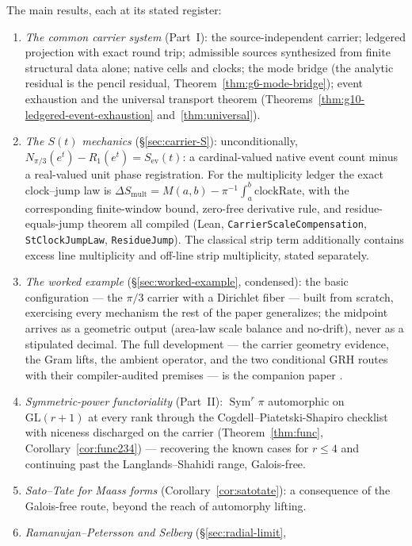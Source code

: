 \documentclass[11pt]{article}
\theoremstyle{definition}
\newcommand{\Sym}{\operatorname{Sym}}
\begin{document}
The main results, each at its stated register:
\begin{enumerate}
\item \emph{The common carrier system} (Part~I): the source-independent
carrier; ledgered projection with exact round trip; admissible sources
synthesized from finite structural data alone; native cells and clocks; the
mode bridge (the analytic residual is the pencil residual,
Theorem~\ref{thm:g6-mode-bridge}); event exhaustion and the universal
transport theorem (Theorems~\ref{thm:g10-ledgered-event-exhaustion}
and~\ref{thm:universal}).
\item \emph{The $S(t)$ mechanics} (\S\ref{sec:carrier-S}): unconditionally,
$N_{\pi/3}(e^{t})-R_{1}(e^{t})=S_{\mathrm{ev}}(t)$: a cardinal-valued native
event count minus a real-valued unit phase registration.  For the
multiplicity ledger the exact clock--jump law is
$\Delta S_{\mathrm{mult}}=M(a,b)-\pi^{-1}\int_a^b\mathrm{clockRate}$, with
the corresponding finite-window bound, zero-free derivative rule, and
residue-equals-jump theorem all compiled (Lean,
\texttt{CarrierScaleCompensation}, \texttt{StClockJumpLaw},
\texttt{ResidueJump}).  The classical strip term additionally contains
excess line multiplicity and off-line strip multiplicity, stated separately.
\item \emph{The worked example} (\S\ref{sec:worked-example}, condensed): the
basic configuration --- the \(\pi/3\) carrier with a Dirichlet fiber ---
built from scratch, exercising every mechanism the rest of the paper
generalizes; the midpoint arrives as a geometric output (area-law scale
balance and no-drift), never as a stipulated decimal.  The full development
--- the carrier geometry evidence, the Gram lifts, the ambient operator, and
the two conditional GRH routes with their compiler-audited premises --- is
the companion paper \cite{GRHCompanion}.
\item \emph{Symmetric-power functoriality} (Part~II): $\Sym^r\pi$ automorphic
on $\mathrm{GL}(r+1)$ at every rank through the Cogdell--Piatetski-Shapiro
checklist with niceness discharged on the carrier (Theorem~\ref{thm:func},
Corollary~\ref{cor:func234}) --- recovering the known cases for $r\le4$ and
continuing past the Langlands--Shahidi range, Galois-free.
\item \emph{Sato--Tate for Maass forms} (Corollary~\ref{cor:satotate}): a
consequence of the Galois-free route, beyond the reach of automorphy lifting.
\item \emph{Ramanujan--Petersson and Selberg} (\S\ref{sec:radial-limit},

\end{enumerate}
\end{document}
